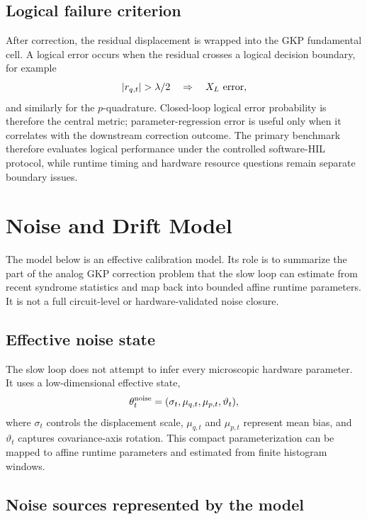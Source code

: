 \documentclass[11pt]{article}
\begin{document}
\subsection{Logical failure criterion}

After correction, the residual displacement is wrapped into the GKP
fundamental cell.  A logical error occurs when the residual crosses a logical
decision boundary, for example
\begin{equation}
    |r_{q,t}|>\lambda/2 \quad \Rightarrow \quad X_L\ {\rm error},
\end{equation}
and similarly for the \(p\)-quadrature.  Closed-loop logical error probability
is therefore the central metric; parameter-regression error is useful only when
it correlates with the downstream correction outcome.  The primary benchmark
therefore evaluates logical performance under the controlled software-HIL protocol,
while runtime timing and hardware resource questions remain separate boundary
issues.

\section{Noise and Drift Model}

The model below is an effective calibration model.  Its role is to summarize
the part of the analog GKP correction problem that the slow loop can estimate
from recent syndrome statistics and map back into bounded affine runtime
parameters.  It is not a full circuit-level or hardware-validated noise
closure.

\subsection{Effective noise state}

The slow loop does not attempt to infer every microscopic hardware parameter.
It uses a low-dimensional effective state,
\begin{equation}
    \theta_t^{\rm noise}
    =
    (\sigma_t,\mu_{q,t},\mu_{p,t},\vartheta_t),
\end{equation}
where \(\sigma_t\) controls the displacement scale, \(\mu_{q,t}\) and
\(\mu_{p,t}\) represent mean bias, and \(\vartheta_t\) captures covariance-axis
rotation.  This compact parameterization can be mapped to affine runtime
parameters and estimated from finite histogram windows.

\subsection{Noise sources represented by the model}
\end{document}
